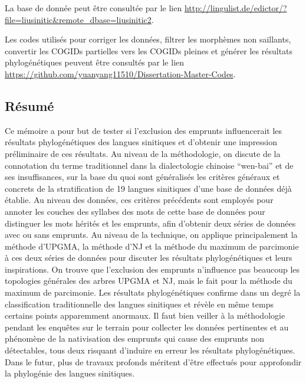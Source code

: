 \documentclass{scrbook}
\newcounter{c}[subsubsection]
\begin{document}
\begin{sloppypar}
\begin{appendices}
La base de donnée peut être consultée par le lien \url{http://lingulist.de/edictor/?file=liusinitic&remote_dbase=liusinitic2}.

Les codes utilisés pour corriger les données, filtrer les morphèmes non saillants, convertir les COGIDs partielles vers les COGIDs pleines et générer les résultats phylogénétiques peuvent être consultés par le lien \url{https://github.com/yuanyang11510/Dissertation-Master-Codes}. 

\end{appendices}

\backmatter
\tableofcontents
\listoftables
\listoffigures

\begin{verso}
\section*{Résumé}
Ce mémoire a pour but de tester si l'exclusion des emprunts influencerait les résultats phylogénétiques des langues sinitiques et d'obtenir une impression préliminaire de ces résultats. Au niveau de la méthodologie, on discute de la connotation du terme traditionnel dans la dialectologie chinoise ``wen-bai'' et de ses insuffisances, sur la base du quoi sont généralisés les critères généraux et concrets de la stratification de 19 langues sinitiques d'une base de données déjà établie. Au niveau des données, ces critères précédents sont employés pour annoter les couches des syllabes des mots de cette base de données pour distinguer les mots hérités et les emprunts, afin d'obtenir deux séries de données avec ou sans emprunts. Au niveau de la technique, on applique principalement la méthode d'UPGMA, la méthode d'NJ et la méthode du maximum de parcimonie à ces deux séries de données pour discuter les résultats phylogénétiques et leurs inspirations. On trouve que l'exclusion des emprunts n'influence pas beaucoup les topologies générales des arbres UPGMA et NJ, mais le fait pour la méthode du maximum de parcimonie. Les résultats phylogénétiques confirme dans un degré la classification traditionnelle des langues sinitiques et révèle en même temps certains points apparemment anormaux. Il faut bien veiller à la méthodologie pendant les enquêtes sur le terrain pour collecter les données pertinentes et au phénomène de la nativisation des emprunts qui cause des emprunts non détectables, tous deux risquant d'induire en erreur les résultats phylogénétiques. Dans le futur, plus de travaux profonds méritent d'être effectués pour approfondir la phylogénie des langues sinitiques.


\end{verso}
\end{sloppypar}
\end{document}
